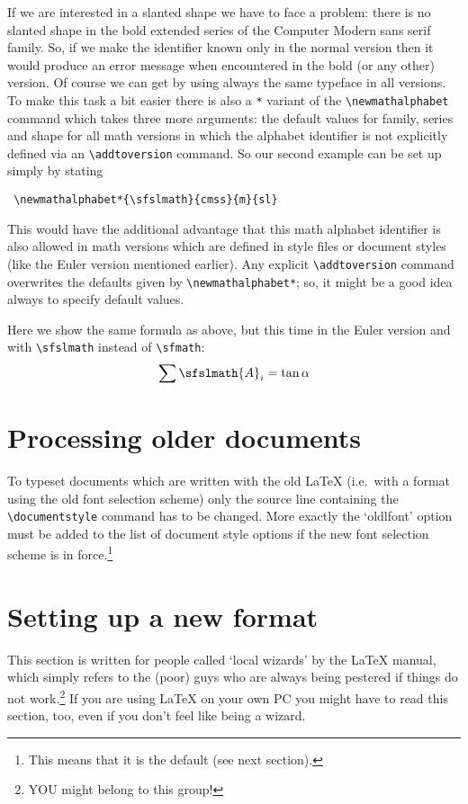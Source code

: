  If we are interested in a slanted shape we have to face a
 problem: there is no slanted shape in the bold extended series of the
 Computer Modern sans serif family.  So, if we make the identifier
 known only in the normal version then it would produce an error message
 when encountered in the bold (or any other) version. Of course we
 can get by
 using always
 the same typeface in all
 versions.  To make this task a bit easier there is also a \verb+*+
  variant
 of the \verb+\newmathalphabet+ command which takes three more
 arguments: the default values for family, series and shape for all
 math versions in which the alphabet identifier is not explicitly
 defined via an \verb+\addtoversion+ command. So our second example
 can be set up simply by stating
\begin{verbatim}
 \newmathalphabet*{\sfslmath}{cmss}{m}{sl}
\end{verbatim}
 This would have the additional advantage that this math alphabet
 identifier is also allowed in math versions which are defined in style
 files or document styles (like the Euler version mentioned earlier).
 Any explicit \verb+\addtoversion+ command overwrites the defaults
 given by \verb+\newmathalphabet*+; so, it might be a good idea always
 to specify default values.

 Here we show the same formula as above, but this time in the Euler
 version and with \verb+\sfslmath+ instead of \verb+\sfmath+:
\[  \sum \sfslmath{A}_{i} = \tan \alpha \]

 \section{Processing older documents}
 \label{sec:oldlfont}

 To typeset documents which are written with the old \LaTeX{}
 (i.e.\ with a format using the old font selection scheme)
  only the source line containing the
 \verb+\documentstyle+ command has to be changed.
 More exactly the `oldlfont' option must be added to the list of
 document style options if the new font selection scheme is in
 force.\footnote{This means that it is the default
                (see next section).}


 \section{Setting up a new format}
 \label{sec:formats}

 This section is written for people called `local wizards' by the
 \LaTeX{} manual, which simply refers to the (poor) guys who
 are always being pestered
 if things do not work.\footnote{YOU might belong to this group!}
 If you are using \LaTeX{} on your own PC you might have to read this
 section, too, even if you don't feel like being a wizard.

